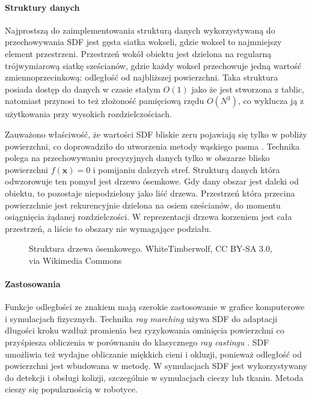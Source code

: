 \paragraph{Struktury danych}
Najprostszą do zaimplementowania strukturą danych wykorzystywaną do przechowywania SDF jest gęsta siatka wokseli, gdzie woksel to najmniejszy element przestrzeni. Przestrzeń wokół obiektu jest dzielona na regularną trójwymiarową siatkę sześcianów, gdzie każdy woksel przechowuje jedną wartość zmiennoprzecinkową: odległość od najbliższej powierzchni. Taka struktura posiada dostęp do danych w czasie stałym $O(1)$ jako że jest stworzona z tablic, natomiast przynosi to też złożoność pamięciową rzędu $O(N^3)$, co wyklucza ją z użytkowania przy wysokich rozdzielczościach.

Zauważono właściwość, że wartości SDF bliskie zeru pojawiają się tylko w pobliży powierzchni, co doprowadziło do utworzenia metody wąskiego pasma \cite{sethian1999}. Technika polega na przechowywaniu precyzyjnych danych tylko w obszarze blisko powierzchni $f(\mathbf{x}) = 0$ i pomijaniu dalszych stref. Strukturą danych która odwzorowuje ten pomysł jest drzewo ósemkowe. Gdy dany obszar jest daleki od obiektu, to pozostaje niepodzielony jako liść drzewa. Przestrzeń która przecina powierzchnie jest rekurencyjnie dzielona na osiem sześcianów, do momentu osiągnięcia żądanej rozdzielczości. W reprezentacji drzewa korzeniem jest cała przestrzeń, a liście to obszary nie wymagające podziału.

\begin{figure}[h!]
    \centering
    
    \caption{Struktura drzewa ósemkowego. WhiteTimberwolf, CC BY-SA 3.0, via Wikimedia Commons}
\end{figure}

\paragraph{Zastosowania}
Funkcje odległości ze znakiem mają szerokie zastosowanie w grafice komputerowe i symulacjach fizycznych. Technika \textit{ray marching} używa SDF do adaptacji długości kroku wzdłuż promienia bez ryzykowania ominięcia powierzchni co przyśpiesza obliczenia w porównaniu do klasycznego \textit{ray castingu} \cite{hart1996}. SDF umożliwia też wydajne obliczanie miękkich cieni i okluzji, ponieważ odległość od powierzchni jest wbudowana w metodę. W symulacjach SDF jest wykorzystywany do detekcji i obsługi kolizji, szczególnie w symulacjach cieczy lub tkanin. Metoda cieszy się popularnością w robotyce.

